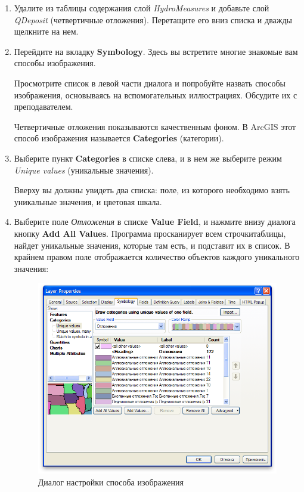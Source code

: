 \documentclass[]{book}
\theoremstyle{definition}
\theoremstyle{definition}
\theoremstyle{definition}
\theoremstyle{remark}
\begin{document}
\begin{enumerate}
\def\labelenumi{\arabic{enumi}.}
\item
  Удалите из таблицы содержания слой \emph{HydroMeasures} и добавьте
  слой \emph{QDeposit} (четвертичные отложения). Перетащите его вниз
  списка и дважды щелкните на нем.
\item
  Перейдите на вкладку \textbf{Symbology}. Здесь вы встретите многие
  знакомые вам способы изображения.

  Просмотрите список в левой части диалога и попробуйте назвать способы
  изображения, основываясь на вспомогательных иллюстрациях. Обсудите их
  с преподавателем.

  Четвертичные отложения показываются качественным фоном. В ArcGIS этот
  способ изображения называется \textbf{Categories} (категории).
\item
  Выберите пункт \textbf{Categories} в списке слева, и в нем же выберите
  режим \emph{Unique values} (уникальные значения).

  Вверху вы должны увидеть два списка: поле, из которого необходимо
  взять уникальные значения, и цветовая шкала.
\item
  Выберите поле \emph{Отложения} в списке \textbf{Value Field}, и
  нажмите внизу диалога кнопку \textbf{Add All Values}. Программа
  просканирует всем строчкитаблицы, найдет уникальные значения, которые
  там есть, и подставит их в список. В крайнем правом поле отображается
  количество объектов каждого уникального значения:

  \begin{figure}
  \centering
  \includegraphics{images/Ex01/image15.png}
  \caption{Диалог настройки способа изображения}
  \end{figure}


\end{enumerate}
\end{document}
